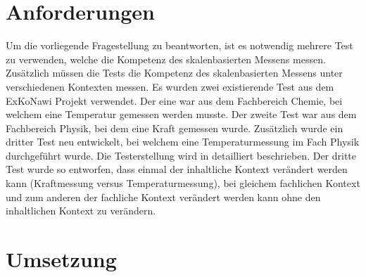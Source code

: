 
\section{Anforderungen}

Um die vorliegende Fragestellung zu beantworten, ist es notwendig mehrere Test zu verwenden, welche die Kompetenz des skalenbasierten Messens messen. Zusätzlich müssen die Tests die Kompetenz des skalenbasierten Messens unter verschiedenen Kontexten messen. Es wurden zwei existierende Test aus dem ExKoNawi Projekt verwendet. Der eine war aus dem Fachbereich Chemie, bei welchem eine Temperatur gemessen werden musste. Der zweite Test war aus dem Fachbereich Physik, bei dem eine Kraft gemessen wurde. Zusätzlich wurde ein dritter Test neu entwickelt, bei welchem eine Temperaturmessung im Fach Physik durchgeführt wurde. Die Testerstellung wird  in \citet{Sichau2015} detailliert beschrieben. Der dritte Test wurde so entworfen, dass einmal der inhaltliche Kontext verändert werden kann (Kraftmessung versus Temperaturmessung), bei gleichem fachlichen Kontext und zum anderen der fachliche Kontext verändert werden kann ohne den inhaltlichen Kontext zu verändern. 


\section{Umsetzung}

